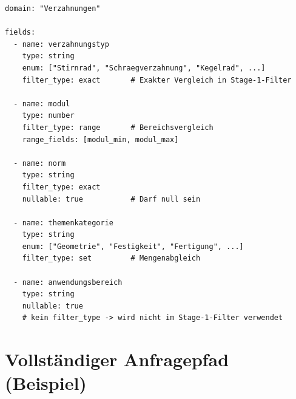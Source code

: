\documentclass[12pt, a4paper]{article}
\begin{document}
\begin{lstlisting}[style=yamlstyle, caption={Metadatenschema Verzahnungen}]
domain: "Verzahnungen"

fields:
  - name: verzahnungstyp
    type: string
    enum: ["Stirnrad", "Schraegverzahnung", "Kegelrad", ...]
    filter_type: exact       # Exakter Vergleich in Stage-1-Filter

  - name: modul
    type: number
    filter_type: range       # Bereichsvergleich
    range_fields: [modul_min, modul_max]

  - name: norm
    type: string
    filter_type: exact
    nullable: true           # Darf null sein

  - name: themenkategorie
    type: string
    enum: ["Geometrie", "Festigkeit", "Fertigung", ...]
    filter_type: set         # Mengenabgleich

  - name: anwendungsbereich
    type: string
    nullable: true
    # kein filter_type -> wird nicht im Stage-1-Filter verwendet
\end{lstlisting}

\newpage
\section{Vollständiger Anfragepfad (Beispiel)}
\end{document}
